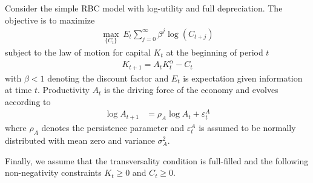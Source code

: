 Consider the simple RBC model with log-utility and full depreciation. The objective is to maximize
\begin{align*}
    \underset{\{C_{t}\}}{\max}~E_t \sum_{j=0}^{\infty} \beta^{j} \log(C_{t+j})
\end{align*}
subject to the law of motion for capital $K_t$ at the beginning of period $t$
\begin{align*}
    K_{t+1} = A_tK_t^\alpha - C_t
\end{align*}
with $\beta <1$ denoting the discount factor and $E_t$ is expectation given information at time $t$. Productivity $A_t$ is the driving force of the economy and evolves according to
\begin{align*}
    \log{A_{t+1}} & = \rho_A \log{A_t}  + \varepsilon_t^A
\end{align*}
where $\rho_A$ denotes the persistence parameter and $\varepsilon_t^A$ is assumed to be normally distributed with mean zero and variance $\sigma_A^2$.

Finally, we assume that the transversality condition is full-filled and the following non-negativity constraints $K_t \geq0$ and $C_t \geq 0$.

